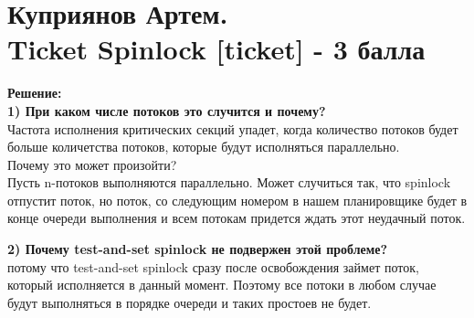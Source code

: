 \documentclass[a4paper,12pt]{paper} %
\begin{document}
\section{Куприянов Артем. \\ Ticket Spinlock [ticket] - 3 балла} 
\textbf{Решение: } \\

\textbf{1) При каком числе потоков это случится и почему? } \\
Частота исполнения критических секций упадет, когда количество потоков будет больше количетства потоков, которые будут исполняться параллельно. \\ Почему это может произойти? \\ Пусть n-потоков выполняются параллельно. Может случиться так, что spinlock отпустит поток, но поток, со следующим номером в нашем планировщике будет в конце очереди выполнения и всем потокам придется ждать этот неудачный поток.



\textbf{2) Почему test-and-set spinlock не подвержен этой проблеме?} \\
потому что test-and-set spinlock сразу после освобождения займет поток, который исполняется в данный момент. Поэтому все потоки в любом случае будут выполняться в порядке очереди и таких простоев не будет.
\end{document}
